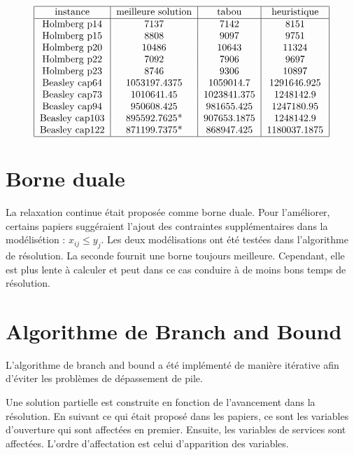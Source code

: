 \begin{align*}
\begin{tabular}{|c|c|c|c|}
    \hline
    instance & meilleure solution & tabou & heuristique \\
    \hline
    Holmberg p14 & 7137 & 7142 & 8151 \\
    Holmberg p15 & 8808 & 9097 & 9751 \\
    Holmberg p20 & 10486 & 10643 & 11324 \\
    Holmberg p22 & 7092 & 7906 & 9697 \\
    Holmberg p23 & 8746 & 9306 & 10897 \\
    Beasley cap64 & 1053197.4375 & 1059014.7 & 1291646.925 \\
    Beasley cap73 & 1010641.45 & 1023841.375 & 1248142.9 \\
    Beasley cap94 & 950608.425 & 981655.425 & 1247180.95 \\
    Beasley cap103 & 895592.7625* & 907653.1875 & 1248142.9 \\
    Beasley cap122 & 871199.7375* & 868947.425 & 1180037.1875 \\
    \hline
\end{tabular}
\end{align*}

\section{Borne duale}

La relaxation continue était proposée comme borne duale.
Pour l'améliorer, certains papiers suggéraient l'ajout des contraintes supplémentaires dans la modélisétion : $x_{ij} \leq y_j$.
Les deux modélisations ont été testées dans l'algorithme de résolution. La seconde fournit une borne toujours meilleure.
Cependant, elle est plus lente à calculer et peut dans ce cas conduire à de moins bons temps de résolution.

\section{Algorithme de Branch and Bound}

L'algorithme de branch and bound a été implémenté de manière itérative afin d'éviter les problèmes de dépassement de pile. \newline

Une solution partielle est construite en fonction de l'avancement dans la résolution.
En suivant ce qui était proposé dans les papiers, ce sont les variables d'ouverture qui sont affectées en premier.
Ensuite, les variables de services sont affectées. L'ordre d'affectation est celui d'apparition des variables. \newline

